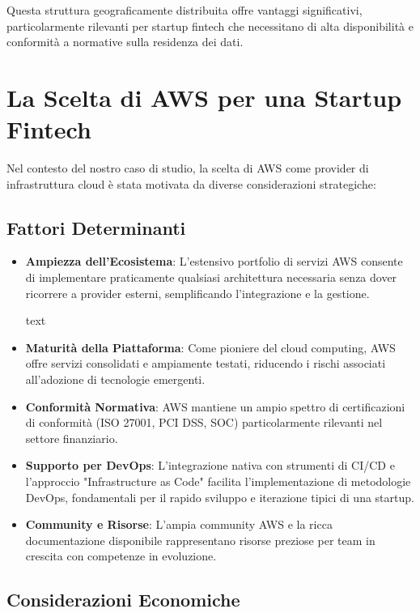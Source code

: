 \documentclass[a4paper,12pt]{report}
\begin{document}
Questa struttura geograficamente distribuita offre vantaggi significativi, particolarmente rilevanti per startup fintech che necessitano di alta disponibilità e conformità a normative sulla residenza dei dati.

\section{La Scelta di AWS per una Startup Fintech}

Nel contesto del nostro caso di studio, la scelta di AWS come provider di infrastruttura cloud è stata motivata da diverse considerazioni strategiche:

\subsection{Fattori Determinanti}

\begin{itemize}
\item \textbf{Ampiezza dell'Ecosistema}: L'estensivo portfolio di servizi AWS consente di implementare praticamente qualsiasi architettura necessaria senza dover ricorrere a provider esterni, semplificando l'integrazione e la gestione.

text
\item \textbf{Maturità della Piattaforma}: Come pioniere del cloud computing, AWS offre servizi consolidati e ampiamente testati, riducendo i rischi associati all'adozione di tecnologie emergenti.

\item \textbf{Conformità Normativa}: AWS mantiene un ampio spettro di certificazioni di conformità (ISO 27001, PCI DSS, SOC) particolarmente rilevanti nel settore finanziario.

\item \textbf{Supporto per DevOps}: L'integrazione nativa con strumenti di CI/CD e l'approccio "Infrastructure as Code" facilita l'implementazione di metodologie DevOps, fondamentali per il rapido sviluppo e iterazione tipici di una startup.

\item \textbf{Community e Risorse}: L'ampia community AWS e la ricca documentazione disponibile rappresentano risorse preziose per team in crescita con competenze in evoluzione.
\end{itemize}

\subsection{Considerazioni Economiche}
\end{document}
